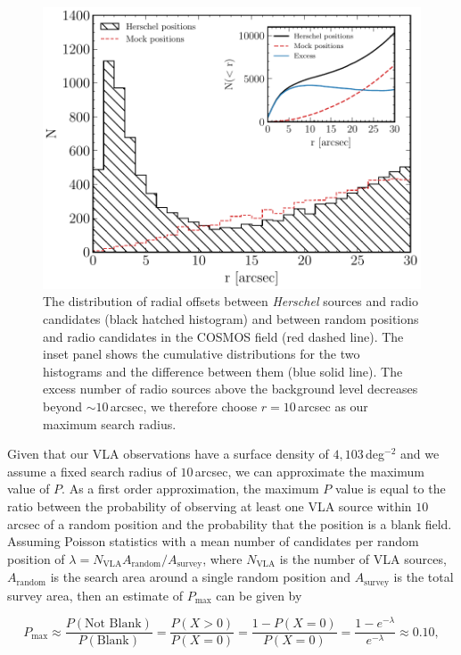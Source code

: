 \begin{figure}
	\centering
	\includegraphics[width=0.73\columnwidth]{Figures/optimal_radius.pdf}
	\caption[Distribution of radial offsets between \textit{Herschel} sources and radio objects]{The distribution of radial offsets between \textit{Herschel} sources and radio candidates (black hatched histogram) and between random positions and radio candidates in the COSMOS field (red dashed line). The inset panel shows the cumulative distributions for the two histograms and the difference between them (blue solid line). The excess number of radio sources above the background level decreases beyond $\sim10\,$arcsec, we therefore choose $r = 10\,$arcsec as our maximum search radius.}
	\label{fig:optimal_radius}
\end{figure}

Given that our VLA observations have a surface density of $4,103\,$deg$^{-2}$ and we assume a fixed search radius of $10\,$arcsec, we can approximate the maximum value of $P$. As a first order approximation, the maximum $P$ value is equal to the ratio between the probability of observing at least one VLA source within $10\,$arcsec of a random position and the probability that the position is a blank field. Assuming Poisson statistics with a mean number of candidates per random position of $\lambda = N_{\textrm{VLA}}A_{\textrm{random}}/A_{\textrm{survey}}$, where $N_{\textrm{VLA}}$ is the number of VLA sources, $A_{\textrm{random}}$ is the search area around a single random position and $A_{\textrm{survey}}$ is the total survey area, then an estimate of $P_{\textrm{max}}$ can be given by

\begin{equation}
    P_{\textrm{max}} \approx \frac{P(\textrm{Not Blank})}{P(\textrm{Blank})} = \frac{P(X > 0)}{P(X = 0)} = \frac{1 - P(X = 0)}{P(X = 0)} = \frac{1 - e^{-\lambda}}{e^{-\lambda}} \approx 0.10,
\end{equation}

